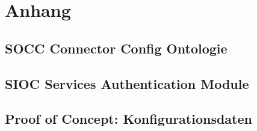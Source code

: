 
\chapter{Anhang} %
\label{cha:anhang}

\section{SOCC Connector Config Ontologie} %
\label{sec:anhang_socc_connector_config_ontologie}




\section{SIOC Services Authentication Module} %
\label{sec:anhang_sioc_services_authentication_module}




\section{Proof of Concept: Konfigurationsdaten} %
\label{sec:anhang_proof_of_concept_konfigurationsdaten}





